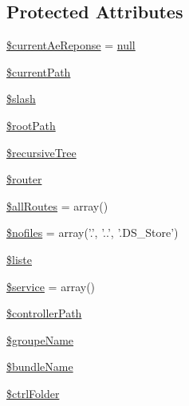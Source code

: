 \subsection*{Protected Attributes}
\begin{DoxyCompactItemize}
\item 
\hyperlink{class_acme_group_1_1services_1_1aetools_1_1aetools_aceacc530af04a70cd5d72fc13ae0641b}{\$current\+Ae\+Reponse} = \hyperlink{validate_8js_afb8e110345c45e74478894341ab6b28e}{null}
\item 
\hyperlink{class_acme_group_1_1services_1_1aetools_1_1aetools_a030e7da3383163e16b83ca3f2d141808}{\$current\+Path}
\item 
\hyperlink{class_acme_group_1_1services_1_1aetools_1_1aetools_a25f0ad4a8d164eb015c4ede6350de0f1}{\$slash}
\item 
\hyperlink{class_acme_group_1_1services_1_1aetools_1_1aetools_a5d52bba7b71fa328c41e53aa3caecc7e}{\$root\+Path}
\item 
\hyperlink{class_acme_group_1_1services_1_1aetools_1_1aetools_adfec7b901da6803f46ca9d8db3d1245c}{\$recursive\+Tree}
\item 
\hyperlink{class_acme_group_1_1services_1_1aetools_1_1aetools_aa9ef70e9081a39609e6d70fc5b73ac03}{\$router}
\item 
\hyperlink{class_acme_group_1_1services_1_1aetools_1_1aetools_a1e6f18d940cf54e9fba03c6349588696}{\$all\+Routes} = array()
\item 
\hyperlink{class_acme_group_1_1services_1_1aetools_1_1aetools_a3aaf26fe1726953bb1c197804b85b4d4}{\$nofiles} = array('.', '..', '.D\+S\+\_\+\+Store')
\item 
\hyperlink{class_acme_group_1_1services_1_1aetools_1_1aetools_a15882f091df636c145af39683e089f44}{\$liste}
\item 
\hyperlink{class_acme_group_1_1services_1_1aetools_1_1aetools_a2f922c44205e60bd19f4aaa19f7c56a6}{\$service} = array()
\item 
\hyperlink{class_acme_group_1_1services_1_1aetools_1_1aetools_a2550830335c21f3516cc3724f8773003}{\$controller\+Path}
\item 
\hyperlink{class_acme_group_1_1services_1_1aetools_1_1aetools_aacf1ea6e0a22468bf5a4f200b92685de}{\$groupe\+Name}
\item 
\hyperlink{class_acme_group_1_1services_1_1aetools_1_1aetools_aaafb0f49f2f14d85e1d77fa9bb991b96}{\$bundle\+Name}
\item 
\hyperlink{class_acme_group_1_1services_1_1aetools_1_1aetools_a1af07bb1b5a7303cce2166212ef83e1c}{\$ctrl\+Folder}

\end{DoxyCompactItemize}
